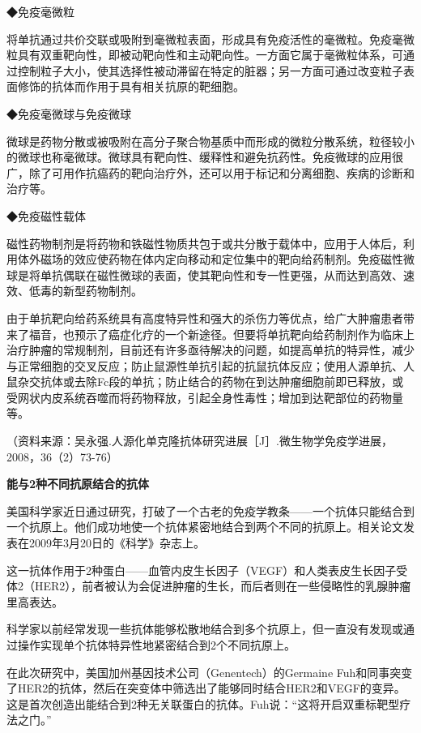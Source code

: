 ◆免疫毫微粒

将单抗通过共价交联或吸附到毫微粒表面，形成具有免疫活性的毫微粒。免疫毫微粒具有双重靶向性，即被动靶向性和主动靶向性。一方面它属于毫微粒体系，可通过控制粒子大小，使其选择性被动滞留在特定的脏器；另一方面可通过改变粒子表面修饰的抗体而作用于具有相关抗原的靶细胞。

◆免疫毫微球与免疫微球

微球是药物分散或被吸附在高分子聚合物基质中而形成的微粒分散系统，粒径较小的微球也称毫微球。微球具有靶向性、缓释性和避免抗药性。免疫微球的应用很广，除了可用作抗癌药的靶向治疗外，还可以用于标记和分离细胞、疾病的诊断和治疗等。

◆免疫磁性载体

磁性药物制剂是将药物和铁磁性物质共包于或共分散于载体中，应用于人体后，利用体外磁场的效应使药物在体内定向移动和定位集中的靶向给药制剂。免疫磁性微球是将单抗偶联在磁性微球的表面，使其靶向性和专一性更强，从而达到高效、速效、低毒的新型药物制剂。

由于单抗靶向给药系统具有高度特异性和强大的杀伤力等优点，给广大肿瘤患者带来了福音，也预示了癌症化疗的一个新途径。但要将单抗靶向给药制剂作为临床上治疗肿瘤的常规制剂，目前还有许多亟待解决的问题，如提高单抗的特异性，减少与正常细胞的交叉反应；防止鼠源性单抗引起的抗鼠抗体反应；使用人源单抗、人鼠杂交抗体或去除Fc段的单抗；防止结合的药物在到达肿瘤细胞前即已释放，或受网状内皮系统吞噬而将药物释放，引起全身性毒性；增加到达靶部位的药物量等。

（资料来源：吴永强.人源化单克隆抗体研究进展［J］.微生物学免疫学进展，2008，36（2）73-76）

\begin{center}
  \textbf{\Large 能与2种不同抗原结合的抗体}
\end{center}
美国科学家近日通过研究，打破了一个古老的免疫学教条------一个抗体只能结合到一个抗原上。他们成功地使一个抗体紧密地结合到两个不同的抗原上。相关论文发表在2009年3月20日的《科学》杂志上。

这一抗体作用于2种蛋白------血管内皮生长因子（VEGF）和人类表皮生长因子受体2（HER2），前者被认为会促进肿瘤的生长，而后者则在一些侵略性的乳腺肿瘤里高表达。

科学家以前经常发现一些抗体能够松散地结合到多个抗原上，但一直没有发现或通过操作实现单个抗体特异性地紧密结合到2个不同抗原上。

在此次研究中，美国加州基因技术公司（Genentech）的Germaine
Fuh和同事突变了HER2的抗体，然后在突变体中筛选出了能够同时结合HER2和VEGF的变异。这是首次创造出能结合到2种无关联蛋白的抗体。Fuh说：“这将开启双重标靶型疗法之门。”

